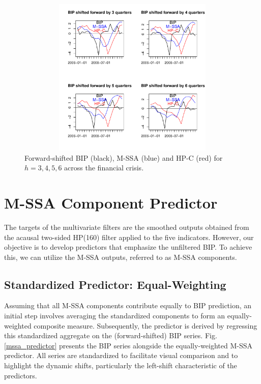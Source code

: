 \documentclass[a4paper]{article}
\begin{document}
\begin{figure}[H]\begin{center}\includegraphics[height=3in, width=4.5in]{./Figures/mssa_hpc_financial_crisis.pdf}\caption{Forward-shifted BIP (black), M-SSA (blue) and HP-C (red) for $h=3,4,5,6$ across the financial crisis.\label{mssa_hpc_financial_crisis}}\end{center}\end{figure}

\section{M-SSA Component Predictor}

The targets of the multivariate filters are the smoothed outputs obtained from the acausal two-sided HP(160) filter applied to the five indicators. However, our objective is to develop predictors that emphasize the unfiltered BIP. To achieve this, we can utilize the  M-SSA outputs, referred to as M-SSA components.




\subsection{Standardized Predictor: Equal-Weighting}


Assuming that all M-SSA components contribute equally to BIP prediction, an initial step involves averaging the standardized components to form an equally-weighted composite measure. Subsequently, the predictor is derived by regressing this standardized aggregate on the (forward-shifted) BIP series. Fig. \eqref{mssa_predictor} presents the BIP series alongside the equally-weighted M-SSA predictor. All series are standardized to facilitate visual comparison and to highlight the dynamic shifts, particularly the left-shift characteristic of the predictors.\\
\end{document}
